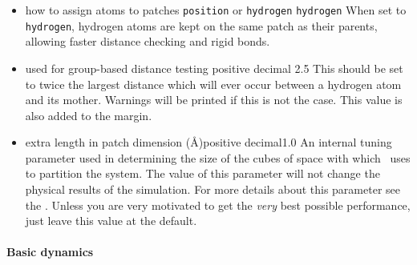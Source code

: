 \begin{itemize}
\item
{}%
{how to assign atoms to patches}%
{\verb!position! or \verb!hydrogen!}%
{\verb!hydrogen!}%
{%
When set to \verb!hydrogen!, hydrogen atoms are kept on the same patch as their parents, allowing faster distance checking and rigid bonds.
}

\item
{}%
{used for group-based distance testing}%
{positive decimal}%
{2.5}%
{%
This should be set to twice the largest distance which will ever occur between a hydrogen atom and its mother.  Warnings will be printed if this is not the case.  This value is also added to the margin.
}

\item
{}%
{extra length in patch dimension (\AA)}{positive decimal}{1.0}%
{An internal tuning parameter used in determining the size of the cubes 
of space with which \NAMD\ uses to partition the system.  The value of 
this parameter will not change the physical results of the simulation.  
For more details about this parameter see the \PG.  
Unless you are very motivated to get the {\it very} best 
possible performance, just leave this value at the default.}


\end{itemize}

\paragraph{Basic dynamics}

